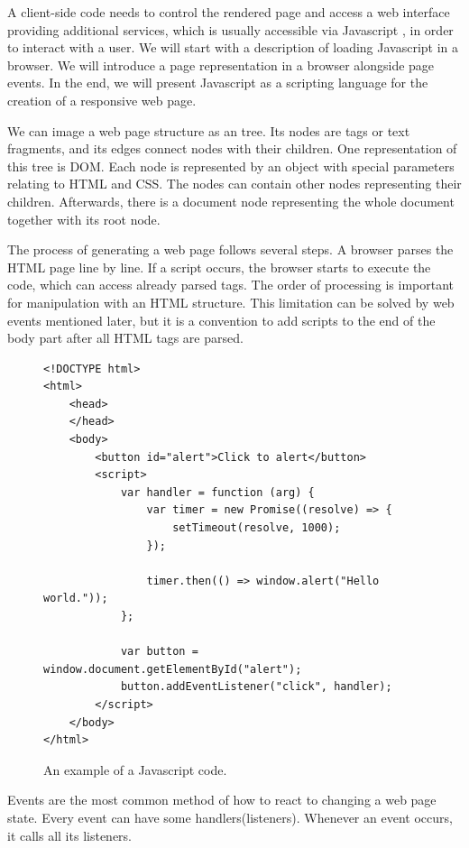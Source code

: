 A client-side code needs to control the rendered page and access a web interface providing additional services, which is usually accessible via Javascript \cite{online:javascriptWiki}, in order to interact with a user.
We will start with a description of loading Javascript in a browser.
We will introduce a page representation in a browser alongside page events.
In the end, we will present Javascript as a scripting language for the creation of a responsive web page.
\par
We can image a web page structure as an tree.
Its nodes are tags or text fragments, and its edges connect nodes with their children.
One representation of this tree is \ac{DOM}.
Each node is represented by an object with special parameters relating to HTML and CSS. 
The nodes can contain other nodes representing their children.
Afterwards, there is a document node representing the whole document together with its root node.
\par
The process of generating a web page follows several steps.
A browser parses the HTML page line by line. If a script occurs, the browser starts to execute the code, which can access already parsed tags.
The order of processing is important for manipulation with an HTML structure.
This limitation can be solved by web events mentioned later, but
it is a convention to add scripts to the end of the body part after all HTML tags are parsed.
\par
\begin{figure}[b!]
\begin{lstlisting}
<!DOCTYPE html>
<html>
    <head>
    </head>
    <body>
        <button id="alert">Click to alert</button>
        <script>
            var handler = function (arg) {
                var timer = new Promise((resolve) => {
                    setTimeout(resolve, 1000);
                }); 
        
                timer.then(() => window.alert("Hello world."));
            };  

            var button = window.document.getElementById("alert");
            button.addEventListener("click", handler);
        </script>
    </body>
</html>
\end{lstlisting}
\caption{An example of a Javascript code.}
\label{img02:javascript}
\end{figure}
\par
Events are the most common method of how to react to changing a web page state.
Every event can have some handlers(listeners).
Whenever an event occurs, it calls all its listeners.
